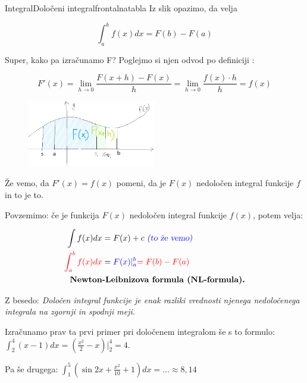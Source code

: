 \begin{priprava}{}{}{Integral}{Določeni integral}{frontalna}{tabla}
Iz slik opazimo, da velja

$$ \int_a^b f(x) dx = F(b) - F(a) $$

Super, kako pa izračunamo F? Poglejmo si njen odvod po definiciji :

$$
F'(x) = \lim_{h \rightarrow 0} \frac{F(x + h) - F(x)}{h} = \lim_{h \rightarrow 0} \frac{f(x) \cdot h}{h} = f(x)
$$

\begin{figure}[h]
    \centering
    \includegraphics[width=0.5\textwidth]{slike/NL_P(x)_P(x+h).png}
\end{figure}

\newpage

Že vemo, da $ F'(x) = f(x) $ pomeni, da je $ F(x) $ nedoločen integral funkcije $ f $  in to je to.


Povzemimo: če je funkcija $ F(x) $ nedoločen integral funkcije $ f(x) $, potem velja:

\begin{align*}
    \int f(x) dx & = F(x) + c \text{ \didopomba{to že vemo}} \\
    \textcolor{rdeca}{\int_a^b f(x) dx} & = \textcolor{modra}{F(x)|_a^b} \textcolor{rdeca}{= F(b) - F(a)} \\
    \text{ \textbf{Newton}} & \text{\textbf{-Leibnizova formula (NL-formula).}}
\end{align*}


Z besedo: \emph{Določen integral funkcije je enak razliki vrednosti njenega nedoločenega integrala na zgornji in spodnji meji.}

Izračunamo prav ta prvi primer pri določenem integralom še s to formulo: $ \int_2^4 (x - 1) dx = (\frac{x^2}{2} - x) |_2^4 = 4 $.

Pa še drugega: $ \int_1^5 (\sin{2x}+\frac{x^2}{10} + 1) dx = \ldots \approx 8,14 $



\end{priprava}
